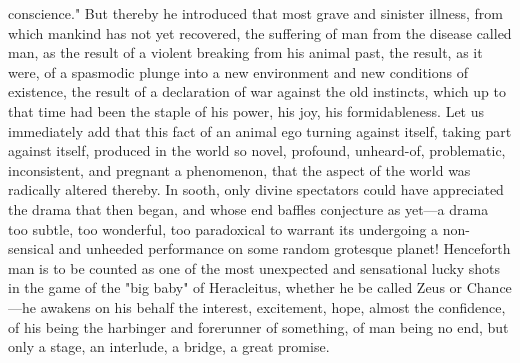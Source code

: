 \documentclass[12pt]{article}
\begin{document}
conscience." But thereby he introduced that most grave and sinister illness, from which mankind has not yet recovered, the suffering of man from the disease called man, as the result of a violent breaking from his animal past, the result, as it were, of a spasmodic plunge into a new environment and new conditions of existence, the result of a declaration of war against the old instincts, which up to that time had been the staple of his power, his joy, his formidableness. Let us immediately add that this fact of an animal ego turning against itself, taking part against itself, produced in the world so novel, profound, unheard-of, problematic, inconsistent, and pregnant a phenomenon, that the aspect of the world was radically altered thereby. In sooth, only divine spectators could have appreciated the drama that then began, and whose end baffles conjecture as yet---a drama too subtle, too wonderful, too paradoxical to warrant its undergoing a non-sensical and unheeded performance on some random grotesque planet! Henceforth man is to be counted as one of the most unexpected and sensational lucky shots in the game of the "big baby" of Heracleitus, whether he be called Zeus or Chance---he awakens on his behalf the interest, excitement, hope, almost the confidence, of his being the harbinger and forerunner of something, of man being no end, but only a stage, an interlude, a bridge, a great promise.
\end{document}
